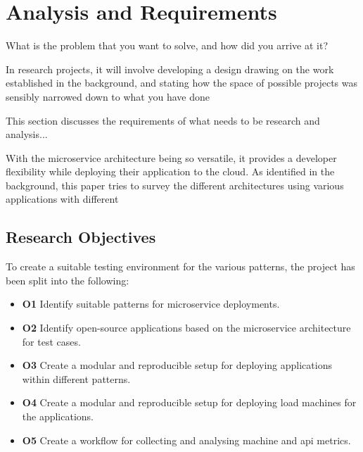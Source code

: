 \chapter{Analysis and Requirements}
What is the problem that you want to solve, and how did you arrive at it?

In research projects, it will involve developing a design drawing on the work
established in the background, and stating how the space of possible projects was
sensibly narrowed down to what you have done

This section discusses the requirements of what needs to be research and analysis... 

With the microservice architecture being so versatile, it provides a developer flexibility while deploying their application to the cloud. As identified in the background, this paper tries to survey the different architectures using various applications with different  



\section{Research Objectives}
To create a suitable testing environment for the various patterns, the project has been split into the following:  
\begin{itemize}
    \item \textbf{O1} Identify suitable patterns for microservice deployments. 
    \item \textbf{O2} Identify open-source applications based on the microservice architecture for test cases. 
    \item \textbf{O3} Create a modular and reproducible setup for deploying applications within different patterns. 
    \item \textbf{O4} Create a modular and reproducible setup for deploying load machines for the applications.
    \item \textbf{O5} Create a workflow for collecting and analysing machine and api metrics.
\end{itemize}